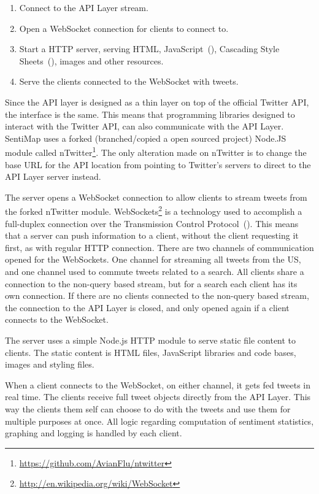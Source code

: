 \begin{enumerate}
\item Connect to the API Layer stream.
\item Open a WebSocket connection for clients to connect to. 
\item Start a HTTP server, serving HTML, JavaScript~(),  Cascading Style Sheets~(), images and other resources. 
\item Serve the clients connected to the WebSocket with tweets.
\end{enumerate}

Since the API layer is designed as a thin layer on top of the official Twitter API, the interface is the same. This means that programming libraries designed to interact with the Twitter API, can also communicate with the API Layer. SentiMap uses a forked (branched/copied a open sourced project) Node.JS module called nTwitter\footnote{\url{https://github.com/AvianFlu/ntwitter}}. The only alteration made on nTwitter is to change the base URL for the API location from pointing to Twitter's servers to direct to the API Layer server instead.

The server opens a WebSocket connection to allow clients to stream tweets from the forked nTwitter module. WebSockets\footnote{\url{http://en.wikipedia.org/wiki/WebSocket}} is a technology used to accomplish a full-duplex connection over the Transmission Control Protocol~(). This means that a server can push information to a client, without the client requesting it first, as with regular HTTP connection. There are two channels of communication opened for the WebSockets. One channel for streaming all tweets from the US, and one channel used to commute tweets related to a search. All clients share a connection to the non-query based stream, but for a search each client has its own connection. If there are no clients connected to the non-query based stream, the connection to the API Layer is closed, and only opened again if a client connects to the WebSocket.

The server uses a simple Node.js HTTP module to serve static file content to clients. The static content is HTML files, JavaScript libraries and code bases, images and styling files.

When a client connects to the WebSocket, on either channel, it gets fed tweets in real time. The clients receive full tweet objects directly from the API Layer. This way the clients them self can choose to do with the tweets and use them for multiple purposes at once. All logic regarding computation of sentiment statistics, graphing and logging is handled by each client.

